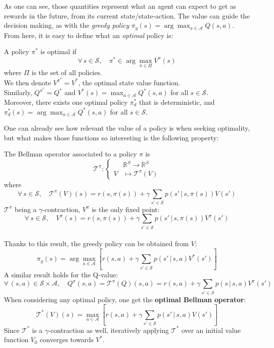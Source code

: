 As one can see, those quantities represent what an agent can expect to get as rewards in the future, from its current state/state-action. The value can guide the decision making, as with the \emph{greedy policy} $\pi_g(s) = \arg\max_{a \in \mathcal{A}} Q(s, a)$. From here, it is easy to define what an \emph{optimal} policy is:

\begin{defi}[Optimality]
  A policy $\pi^*$ is optimal if $$\forall \, s \in \mathcal{S},\quad \pi^* \in \arg\max_{\pi \in \Pi} V^\pi(s)$$ where $\Pi$ is the set of all policies.\\
  We then denote $V^{\pi^*} = V^*$, the optimal state value function.\\
  Similarly, $Q^{\pi^*} = Q^*$ and $V^*(s) = \max_{a \in \mathcal{A}} Q^*(s, a)$ for all $s \in \mathcal{S}$.\\
  Moreover, there exists one optimal policy $\pi^*_d$ that is deterministic, and $\pi^*_d(s) = \arg\max_{a \in \mathcal{A}} Q^*(s,a)$ for all $s \in \mathcal{S}$.
\end{defi}

One can already see how relevant the value of a policy is when seeking optimality, but what makes those functions so interesting is the following property:

\begin{defi}
  The Bellman operator associated to a policy $\pi$ is $$\mathcal{T}^\pi : \begin{cases} &\mathbb{R}^S \to \mathbb{R}^S\\ V &\mapsto \mathcal{T}^\pi(V) \end{cases}$$ where $$\forall \, s \in \mathcal{S},\quad \mathcal{T}^\pi(V)(s) = r(s, \pi(s)) + \gamma \sum_{s'\in \mathcal{S}} p(s' \,|\, s, \pi(s)) V(s')$$
  $\mathcal{T}^\pi$ being a $\gamma$-contraction, $V^\pi$ is the only fixed point: $$\forall \, s \in \mathcal{S},\quad V^\pi(s) = r(s, \pi(s)) + \gamma \sum_{s'\in \mathcal{S}} p(s' \,|\, s, \pi(s)) V^\pi(s')$$\\
  Thanks to this result, the greedy policy can be obtained from $V$: $$\pi_g(s) = \arg\max_{a \in \mathcal{A}} \left[ r(s,a) + \gamma \sum_{s' \in \mathcal{S}}p(s' \,|\, s, a) V^*(s') \right]$$
  A similar result holds for the Q-value: $$\forall \, (s, a) \in \mathcal{S}\times \mathcal{A},\quad Q^\pi(s, a) = \mathcal{T}^\pi(Q)(s,a) = r(s, a) + \gamma \sum_{s' \in \mathcal{S}} p(s \,|\, s,a) V^\pi (s')$$
  When considering any optimal policy, one get the \textbf{optimal Bellman operator}: $$\mathcal{T}^*(V)(s) = \max_{a \in \mathcal{A}} \left[ r(s, a) + \gamma \sum_{s' \in \mathcal{S}} p(s' \,|\, s,a)V(s') \right]$$
  Since $\mathcal{T}^*$ is a $\gamma$-contraction as well, iteratively applying $\mathcal{T}^*$ over an initial value function $V_0$ converges towards $V^*$.
\end{defi}

